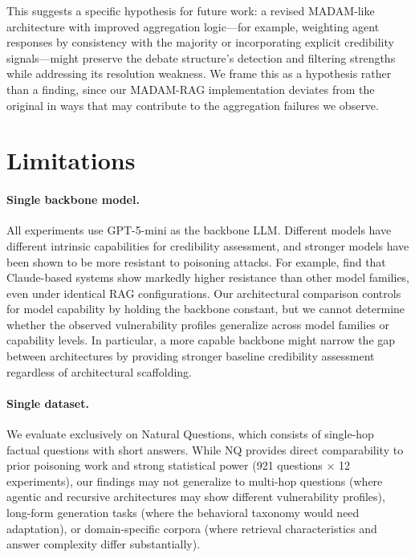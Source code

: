 \documentclass[11pt]{article}
\begin{document}
This suggests a specific hypothesis for future work: a revised MADAM-like architecture with improved aggregation logic---for example, weighting agent responses by consistency with the majority or incorporating explicit credibility signals---might preserve the debate structure's detection and filtering strengths while addressing its resolution weakness. We frame this as a hypothesis rather than a finding, since our MADAM-RAG implementation deviates from the original in ways that may contribute to the aggregation failures we observe.


\section{Limitations}
\label{sec:limitations}

\paragraph{Single backbone model.} All experiments use GPT-5-mini as the backbone LLM. Different models have different intrinsic capabilities for credibility assessment, and stronger models have been shown to be more resistant to poisoning attacks. For example, \citet{ragsecbench2025} find that Claude-based systems show markedly higher resistance than other model families, even under identical RAG configurations. Our architectural comparison controls for model capability by holding the backbone constant, but we cannot determine whether the observed vulnerability profiles generalize across model families or capability levels. In particular, a more capable backbone might narrow the gap between architectures by providing stronger baseline credibility assessment regardless of architectural scaffolding.

\paragraph{Single dataset.} We evaluate exclusively on Natural Questions, which consists of single-hop factual questions with short answers. While NQ provides direct comparability to prior poisoning work and strong statistical power (921 questions $\times$ 12 experiments), our findings may not generalize to multi-hop questions (where agentic and recursive architectures may show different vulnerability profiles), long-form generation tasks (where the behavioral taxonomy would need adaptation), or domain-specific corpora (where retrieval characteristics and answer complexity differ substantially).
\end{document}
